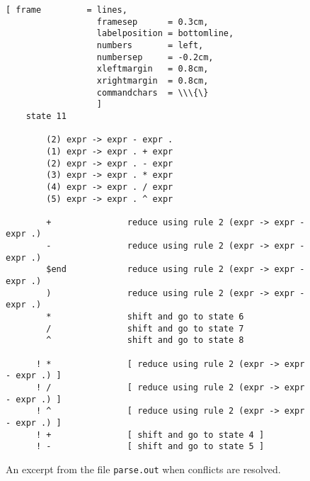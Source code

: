 \begin{figure}[!ht]
\centering
\begin{Verbatim}[ frame         = lines, 
                  framesep      = 0.3cm, 
                  labelposition = bottomline,
                  numbers       = left,
                  numbersep     = -0.2cm,
                  xleftmargin   = 0.8cm,
                  xrightmargin  = 0.8cm,
                  commandchars  = \\\{\}
                  ]
    state 11
    
        (2) expr -> expr - expr .
        (1) expr -> expr . + expr
        (2) expr -> expr . - expr
        (3) expr -> expr . * expr
        (4) expr -> expr . / expr
        (5) expr -> expr . ^ expr
    
        +               reduce using rule 2 (expr -> expr - expr .)
        -               reduce using rule 2 (expr -> expr - expr .)
        $end            reduce using rule 2 (expr -> expr - expr .)
        )               reduce using rule 2 (expr -> expr - expr .)
        *               shift and go to state 6
        /               shift and go to state 7
        ^               shift and go to state 8
    
      ! *               [ reduce using rule 2 (expr -> expr - expr .) ]
      ! /               [ reduce using rule 2 (expr -> expr - expr .) ]
      ! ^               [ reduce using rule 2 (expr -> expr - expr .) ]
      ! +               [ shift and go to state 4 ]
      ! -               [ shift and go to state 5 ]                  
\end{Verbatim} 
\vspace*{-0.3cm}
\caption{An excerpt from the file \texttt{parse.out} when conflicts are resolved.}
\label{fig:Conflicts-Resolved.ipynb:state11}
\end{figure} %

